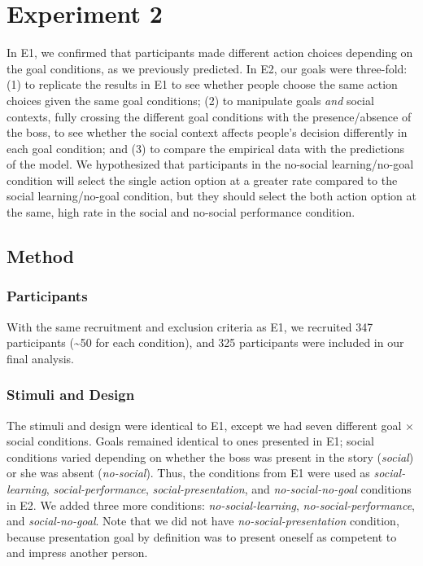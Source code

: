 \documentclass[10pt, letterpaper]{article}
\begin{document}
\section{Experiment 2}\label{experiment-2}

In E1, we confirmed that participants made different action choices
depending on the goal conditions, as we previously predicted. In E2, our
goals were three-fold: (1) to replicate the results in E1 to see whether
people choose the same action choices given the same goal conditions;
(2) to manipulate goals \emph{and} social contexts, fully crossing the
different goal conditions with the presence/absence of the boss, to see
whether the social context affects people's decision differently in each
goal condition; and (3) to compare the empirical data with the
predictions of the model. We hypothesized that participants in the
no-social learning/no-goal condition will select the single action
option at a greater rate compared to the social learning/no-goal
condition, but they should select the both action option at the same,
high rate in the social and no-social performance condition.

\subsection{Method}\label{method-1}

\subsubsection{Participants}\label{participants-1}

With the same recruitment and exclusion criteria as E1, we recruited 347
participants (\textasciitilde{}50 for each condition), and 325
participants were included in our final analysis.

\subsubsection{Stimuli and Design}\label{stimuli-and-design-1}

The stimuli and design were identical to E1, except we had seven
different goal \(\times\) social conditions. Goals remained identical to
ones presented in E1; social conditions varied depending on whether the
boss was present in the story (\emph{social}) or she was absent
(\emph{no-social}). Thus, the conditions from E1 were used as
\emph{social-learning}, \emph{social-performance},
\emph{social-presentation}, and \emph{no-social-no-goal} conditions in
E2. We added three more conditions: \emph{no-social-learning},
\emph{no-social-performance}, and \emph{social-no-goal}. Note that we
did not have \emph{no-social-presentation} condition, because
presentation goal by definition was to present oneself as competent to
and impress another person.
\end{document}
